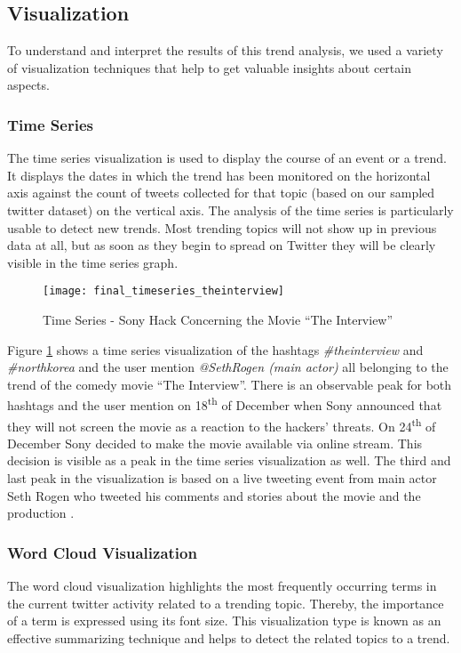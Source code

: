 \subsection{Visualization}
\label{subsec:visualization}
To understand and interpret the results of this trend analysis, we used a variety of visualization techniques that help to get valuable insights about certain aspects.

\subsubsection{Time Series}
\label{subsubsec:vis-time-series}
The time series visualization is used to display the course of an event or a trend. It displays the dates in which the trend has been monitored on the horizontal axis against the count of tweets collected for that topic (based on our sampled twitter dataset) on the vertical axis. The analysis of the time series is particularly usable to detect new trends. Most trending topics will not show up in previous data at all, but as soon as they begin to spread on Twitter they will be clearly visible in the time series graph.

\begin{figure}[H]
  \centering
        \texttt{[image: final\_timeseries\_theinterview]}
  \caption[Time Series - Sony Hack Concerning the Movie \enquote{The Interview}]{Time Series - Sony Hack Concerning the Movie \enquote{The Interview}}
  \label{fig:time-series-interview}
  \vspace{-1.3em}
\end{figure}

Figure \ref{fig:time-series-interview} shows a time series visualization of the hashtags \textit{\#theinterview} and \textit{\#northkorea} and the user mention \textit{@SethRogen (main actor)} all belonging to the trend of the comedy movie \enquote{The Interview}. There is an observable peak for both hashtags and the user mention on 18\textsuperscript{th} of December when Sony announced that they will not screen the movie as a reaction to the hackers' threats. On 24\textsuperscript{th} of December Sony decided to make the movie available via online stream. This decision is visible as a peak in the time series visualization as well. The third and last peak in the visualization is based on a live tweeting event from main actor Seth Rogen who tweeted his comments and stories about the movie and the production \cite{deadline2014interview}.

\subsubsection{Word Cloud Visualization}
\label{subsubsec:vis-word-clouds}
The word cloud visualization highlights the most frequently occurring terms in the current twitter activity related to a trending topic. Thereby, the importance of a term is expressed using its font size. This visualization type is known as an effective summarizing technique and helps to detect the related topics to a trend.

